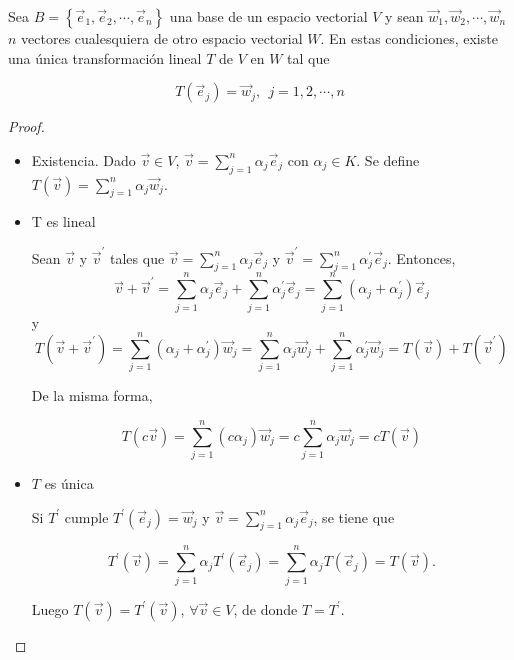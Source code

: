 \bigskip

\bigskip


\begin{theorem}
\label{TEO1}


Sea $B= \left\{\vec{e}_1,\vec{e}_2,\cdots, \vec{e}_n\right\}$ una base de un espacio vectorial $V$  y sean $\vec{w}_1,\vec{w}_2,\cdots, \vec{w}_n$ $n$ vectores cualesquiera de otro espacio vectorial $W$. En estas condiciones, existe una única transformación lineal $T$ de $V$ en $W$ tal que 

$$T(\vec{e}_j)=\vec{w}_j, ~~
j=1,2, \cdots, n$$

\begin{proof}
\begin{itemize}
\item
Existencia.
Dado $\vec{v} \in V$,  $\vec{v}= \sum_{j=1}^{n} \alpha_j \vec{e}_j  $ con $\alpha_j \in K$.
Se define $T(\vec{v})= \sum_{j=1}^{n} \alpha_j \vec{w}_j $.  
\item
T es lineal


Sean $\Vec{v}$ y $\Vec{v}^{\prime}$  tales que $\vec{v}= \sum_{j=1}^{n} \alpha_j \vec{e}_j  $ y $\vec{v}^{\prime}= \sum_{j=1}^{n} \alpha_j^{\prime} \vec{e}_j  $. Entonces,
$$\vec{v}  +\vec{v}^{\prime} =  \sum_{j=1}^{n} \alpha_j \vec{e}_j + \sum_{j=1}^{n} \alpha_j^{\prime} \vec{e}_j =\sum_{j=1}^{n}( \alpha_j + \alpha_j^{\prime}) \vec{e}_j  $$
y 
$$   T(\vec{v} + \Vec{v}^{\prime}  )= \sum_{j=1}^{n} ( \alpha_j + \alpha_j^{\prime}) \vec{w}_j = \sum_{j=1}^{n} \alpha_j  \vec{w}_j + \sum_{j=1}^{n} \alpha_j^{\prime} \vec{w}_j =T(\vec{v}) + T(\Vec{v}^{\prime} ) $$

De la misma forma, 

$$   T(c\vec{v} )= \sum_{j=1}^{n} (c \alpha_j ) \vec{w}_j = c \sum_{j=1}^{n} \alpha_j  \vec{w}_j  = cT(\vec{v}) $$
\item
$T$ es única

Si $T^{\prime}$ cumple  $T^{\prime}(\vec{e}_j)=\vec{w}_j$ y $\vec{v}= \sum_{j=1}^{n} \alpha_j \vec{e}_j  $,  se tiene que 


$$T^{\prime}(\vec{v})= \sum_{j=1}^{n} \alpha_j T^{\prime}(\vec{e}_j)= \sum_{j=1}^{n} \alpha_j T(\vec{e}_j)=T(\vec{v}).$$

\bigskip


Luego $T( \vec{v})=T^{\prime}(\vec{v}) $, $\forall  \vec{v} \in V $, de donde $T=T^{\prime} $.

\end{itemize}
\end{proof}
\end{theorem}

